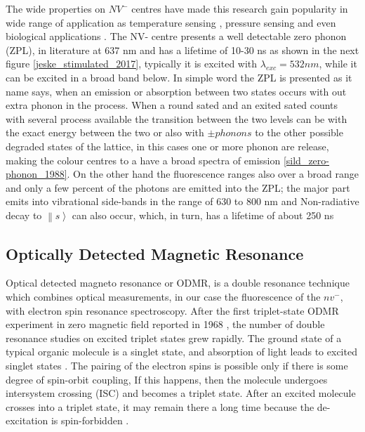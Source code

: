 The wide properties on $NV^{-}$ centres have made this research gain popularity in wide range of application as temperature sensing \cite{neumann_high-precision_2013}, pressure sensing \cite{doherty_electronic_2014} and even biological applications \cite{mcguinness_quantum_2011}. The NV- centre presents a well detectable zero phonon (ZPL), in literature at 637 nm  and has a lifetime of 10-30 ns as shown in the next figure \ref{jeske_stimulated_2017}, typically it is excited with $\lambda_{exc}=532nm$, while it can be excited in a broad band below. In simple word the ZPL is presented as it name says, when an emission or absorption between two states occurs with out extra phonon in the process. When a round sated and an exited sated counts with several process available the transition between the two levels can be with the exact energy between the two or also with $\pm phonons$ to the other possible degraded states of the lattice, in this cases one or more phonon are release, making the colour centres to a have a broad spectra of emission \ref{sild_zero-phonon_1988}.
On the other hand  the fluorescence ranges also over a broad range and only a few percent of the photons are emitted into the ZPL; the major part emits into vibrational side-bands in the range of 630 to 800 nm \cite{doherty} and  Non-radiative decay to $\left\|s\right\rangle$ can also occur, which, in turn, has a lifetime of about 250 ns \cite{schirhagl_nitrogen-vacancy_2014}


\subsection{Optically Detected Magnetic Resonance}

Optical detected magneto resonance or ODMR, is  a  double  resonance  technique  which  combines  optical measurements, in our case the fluorescence of the $nv^{-}$, with  electron  spin  resonance  spectroscopy.  After  the  first triplet-state ODMR experiment in zero magnetic field reported  in 1968 \cite{schmidt_optical_1967}, the  number  of double resonance studies on excited triplet states grew rapidly.  The ground state of a typical organic molecule is a singlet state, and absorption of light leads to excited singlet states \cite{pham_magnetic_nodate}. The pairing of the electron spins is possible only if there is some degree of spin-orbit coupling, If this happens, then the molecule undergoes intersystem crossing (ISC)  and  becomes  a  triplet  state. After an excited molecule crosses into a triplet state, it may remain there a long time because the de-excitation is
spin-forbidden \cite{carbonera_optically_2009}.

